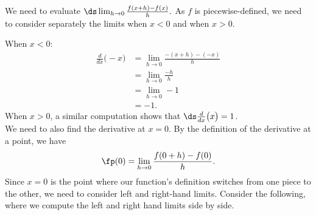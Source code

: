 {We need to evaluate $\ds \lim_{h\to0}\frac{f(x+h)-f(x)}{h}.$ As $f$ is piecewise-defined, we need to consider separately the limits when $x<0$ and when $x>0$. \\


When $x<0$:
	\begin{align*}
	\frac{d}{dx}\big(-x\big)
	&= \lim_{h\to 0}\frac{-(x+h) - (-x)}{h} \\
	&=	\lim_{h\to 0}\frac{-h}{h}\\
	&=	\lim_{h\to 0}-1 \\
	&=	-1.
	\end{align*}
When $x>0$, a similar computation shows that $\ds \frac{d}{dx}\big(x\big) = 1$. \\

We need to also find the derivative at $x=0$. By the definition of the derivative at a point, we have $$\fp(0) = \lim_{h\to0}\frac{f(0+h)-f(0)}{h}.$$ Since $x=0$ is the point where our function's definition switches from one piece to the other, we need to consider left and right-hand limits. Consider the following, where we compute the left and right hand limits side by side.

}
